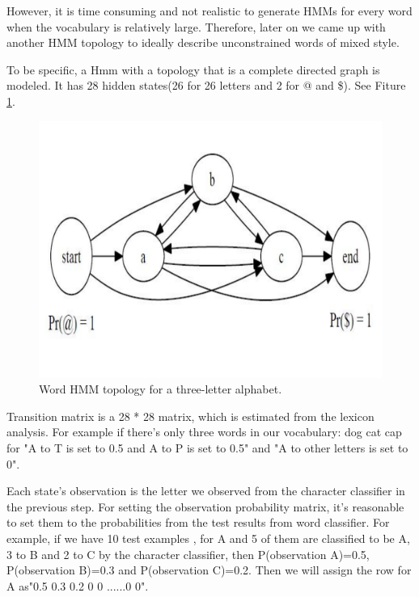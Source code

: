 \begin{enumerate}

However, it is time consuming and not realistic to generate HMMs for every word when the vocabulary is relatively large. Therefore, later on we came up with another HMM topology to ideally describe unconstrained words of mixed style.

To be specific, a Hmm  with a topology that is a complete directed graph is modeled. It has 28 hidden states(26 for 26 letters and 2 for @ and \$). See Fiture \ref{figure:wordtopology}. 

\begin{figure}[h!]
  \centering
  \includegraphics[width=5in]{wordtopology}
  \caption{Word HMM topology for a three-letter alphabet.}
  \label{figure:wordtopology}
\end{figure}


Transition matrix is a 28 * 28 matrix, which is estimated from the lexicon analysis. For example if there's only three words in our vocabulary: dog cat cap for "A to T is set to 0.5 and A to P is set to 0.5" and "A to other letters is set to 0".

Each state's observation is the letter we observed from the character classifier in the previous step. For setting the observation probability matrix, it's reasonable to set them to the probabilities from the test results from word classifier. For example, if we have 10 test examples , for A and 5 of them are classified to be A, 3 to B and 2 to C by the character classifier, then P(observation A)=0.5, P(observation B)=0.3 and P(observation C)=0.2. Then we will assign the row for A as"0.5 0.3 0.2 0 0 ......0 0".

\end{enumerate}


